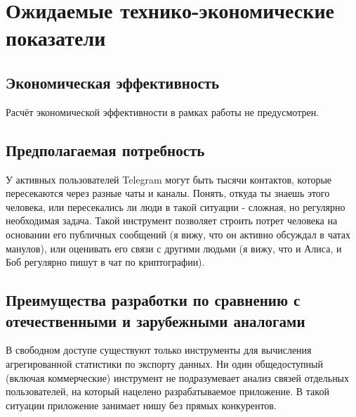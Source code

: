 \section{Ожидаемые технико-экономические показатели}

\subsection{Экономическая эффективность}

Расчёт экономической эффективности в рамках работы не предусмотрен.

\subsection{Предполагаемая потребность}

У активных пользователей Telegram могут быть тысячи контактов, которые пересекаются через разные чаты и каналы. Понять, откуда ты знаешь этого человека, или пересекались ли люди в такой ситуации - сложная, но регулярно необходимая задача.
Такой инструмент позволяет строить потрет человека на основании его публичных сообщений (я вижу, что он активно обсуждал в чатах манулов), или оценивать его связи с другими людьми (я вижу, что и Алиса, и Боб регулярно пишут в чат по криптографии).

\subsection{Преимущества разработки по сравнению с отечественными и зарубежными аналогами}

В свободном доступе существуют только инструменты для вычисления агрегированной статистики по экспорту данных. Ни один общедоступный (включая коммерческие) инструмент не подразумевает анализ связей отдельных пользователей, на который нацелено разрабатываемое приложение.
В такой ситуации приложение занимает нишу без прямых конкурентов.